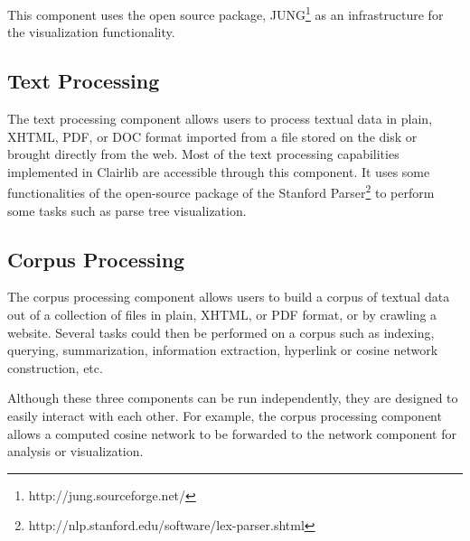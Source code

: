 This component uses the open source package, JUNG\footnote{http://jung.sourceforge.net/} as an infrastructure for the visualization functionality.

\subsection{Text Processing}

The text processing component allows users to process textual data in plain, XHTML, PDF, or DOC format imported from a file stored on the disk or brought directly from the web. Most of the text processing capabilities implemented in Clairlib are accessible through this component. It uses some functionalities of the open-source package of the Stanford Parser\footnote{http://nlp.stanford.edu/software/lex-parser.shtml} to perform some tasks such as parse tree visualization.

\subsection{Corpus Processing}

The corpus processing component allows users to build a corpus of textual data out of a collection of files in plain, XHTML, or PDF format, or by crawling a website. Several tasks could then be performed on a corpus such as indexing, querying, summarization, information extraction, hyperlink or cosine network construction, etc.

Although these three components can be run independently, they are designed to easily interact with each other. For example, the corpus processing component allows a computed cosine network to be forwarded to the network component for analysis or visualization.

